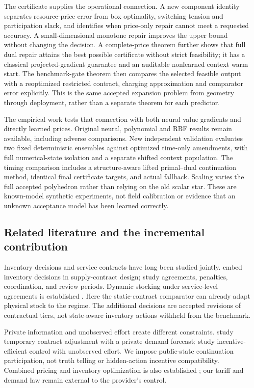 \documentclass[11pt,letterpaper]{article}
\theoremstyle{definition}
\newcommand{\1}{\mathbf 1}
\begin{document}
The certificate supplies the operational connection. A new component identity separates resource-price error from box optimality, switching tension and participation slack, and identifies when price-only repair cannot meet a requested accuracy. A small-dimensional monotone repair improves the upper bound without changing the decision. A complete-price theorem further shows that full dual repair attains the best possible certificate without strict feasibility; it has a classical projected-gradient guarantee and an auditable nonlearned context warm start. The benchmark-gate theorem then compares the selected feasible output with a reoptimized restricted contract, charging approximation and comparator error explicitly. This is the same accepted expansion problem from geometry through deployment, rather than a separate theorem for each predictor.

The empirical work tests that connection with both neural value gradients and directly learned prices. Original neural, polynomial and RBF results remain available, including adverse comparisons. New independent validation evaluates two fixed deterministic ensembles against optimized time-only amendments, with full numerical-state isolation and a separate shifted context population. The timing comparison includes a structure-aware lifted primal--dual continuation method, identical final certificate targets, and actual fallback. Scaling varies the full accepted polyhedron rather than relying on the old scalar star. These are known-model synthetic experiments, not field calibration or evidence that an unknown acceptance model has been learned correctly.
\subsection{Related literature and the incremental contribution}
Inventory decisions and service contracts have long been studied jointly. \citet{Henig1997} embed inventory decisions in supply-contract design; \citet{LiangAtkins2013,Sieke2012,Katok2008} study agreements, penalties, coordination, and review periods. Dynamic stocking under service-level agreements is established \citep{Hosseinifard2022,Caggiano2007,Abbasi2022}. Here the static-contract comparator can already adapt physical stock to the regime. The additional decisions are accepted revisions of contractual tiers, not state-aware inventory actions withheld from the benchmark.

Private information and unobserved effort create different constraints. \citet{NasserTurcic2019} study temporary contract adjustment with a private demand forecast; \citet{PlambeckZenios2003} study incentive-efficient control with unobserved effort. We impose public-state continuation participation, not truth telling or hidden-action incentive compatibility. Combined pricing and inventory optimization is also established \citep{FedergruenHeching1999}; our tariff and demand law remain external to the provider's control.
\end{document}
